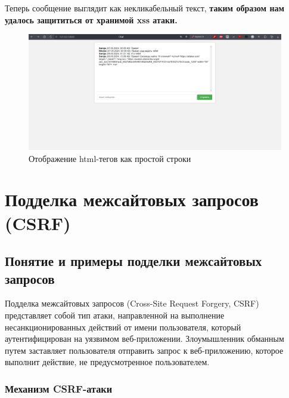 \documentclass[a4paper,12pt]{diplom}
\begin{document}
	 
	 Теперь сообщение выглядит как некликабельный текст, \textbf{таким образом нам удалось защититься от хранимой xss атаки.}
	 \begin{figure}[!ht]
	 	{\centering
	 		\includegraphics[width=1\textwidth]{chat_xss_attack_failed.png}
	 		\caption{Отображение html-тегов как простой строки}
	 		\label{fig:chat_xss_attack_failed}
	 	}
	 \end{figure}
	 
	 
	 
	 
	 
	 
	 
	 
	 
	 
	 
	 
	 
	 
	 
	 
	 
	 
	 
	 
	 
	 
	 \chapter[Подделка межсайтовых запросов (CSRF)]{Подделка межсайтовых запросов (CSRF)}
	 
	 
	 \section{Понятие и примеры подделки межсайтовых запросов}
	 
	 Подделка межсайтовых запросов (Cross-Site Request Forgery, CSRF) представляет собой тип атаки, направленной на выполнение несанкционированных действий от имени пользователя, который аутентифицирован на уязвимом веб-приложении. Злоумышленник обманным путем заставляет пользователя отправить запрос к веб-приложению, которое выполнит действие, не предусмотренное пользователем.
	 
	 \subsection{Механизм CSRF-атаки}
	 
\end{document}

